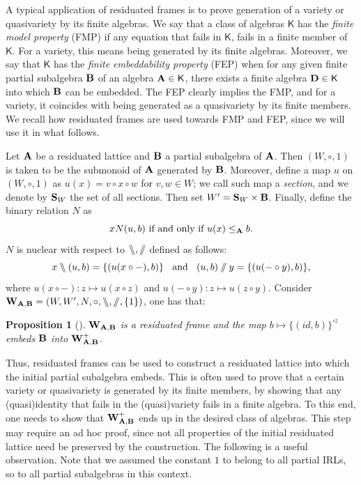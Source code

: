 \documentclass{amsart}
\newtheorem{proposition}[theorem]{Proposition}
\theoremstyle{definition}
\numberwithin{equation}{section}
\newcommand{\alg}[1]{{\textbf{\upshape #1}}}  %
\newcommand{\vv}[1]{\mathsf {#1}}
\newcommand{\leftr}{\bbslash}
\newcommand{\rightr}{\sslash}
\begin{document}
A typical application of residuated frames is to prove generation of a variety or quasivariety by its finite algebras. We say that a class of algebras $\vv K$ has the {\em finite model property} (FMP) if any equation that fails in $\vv K$, fails in a finite member of $\vv K$. For a variety, this means being generated by its finite algebras. Moreover, we say that $\vv K$ has the {\em finite embeddability property} (FEP) when for any given finite partial subalgebra $\alg B$ of an algebra $\alg A \in \vv K$, there exists a finite algebra $\alg D \in \vv K$ into which $\alg B$ can be embedded. The FEP clearly implies the FMP, and for a variety, it coincides with being generated as a quasivariety by its finite members. We recall how residuated frames are used towards FMP and FEP, since we will use it in what follows.
 
 Let $\alg A$ be a residuated lattice and $\alg B$ a partial subalgebra of $\alg A$. Then $(W, \circ, 1)$ is taken to be the submonoid of $\alg A$ generated by $\alg B$. Moreover, define a map $u$ on $(W, \circ, 1)$ as $u(x)=v \circ x \circ w$ for $v, w \in W$; we call such map a {\em section}, and we denote by $\alg S_W$ the set of all sections. Then set $W'=\alg S_W \times \alg B$. Finally, define the binary relation $N$ as $$x N (u,b) \mbox{ if and only if } u(x)\leq_{\alg A} b.$$ $N$ is nuclear with respect to $\leftr,\rightr$ defined as follows: 
 $$x \leftr (u,b)= \{(u(x \circ -), b)\} \;\;\mbox{ and }\;\; (u,b) \rightr y= \{(u(- \circ y), b)\},$$
 where $u(x \circ -): z \mapsto u(x \circ z)$ and $u(- \circ y): z \mapsto u(z \circ y)$.
Consider $\alg W_{\alg A, \alg B}=(W,W',N, \circ, \leftr, \rightr, \{1\})$, one has that: 
 \begin{proposition}[{\cite{GalatosJipsen2013}}]\label{prop:galatosjipsen}
$\alg W_{\alg A, \alg B}$ is a residuated frame and the map $b \mapsto \{(id, b)\}^\triangleleft$ embeds $\alg B$ into $\alg W_{\alg A, \alg B}^+$. 
\end{proposition}
Thus, residuated frames can be used to construct a residuated lattice into which the initial partial subalgebra embeds. This is often used to prove that a certain variety or quasivariety is generated by its finite members,  by showing that any (quasi)identity that fails in the (quasi)variety fails in a finite algebra. To this end, one needs to show that $\alg W_{\alg A, \alg B}^+$ ends up in the desired class of algebras. This step may require an ad hoc proof, since not all properties of the initial residuated lattice need be preserved by the construction. The following is a useful observation. Note that we assumed the constant $1$ to belong to all partial IRLs, so to all partial subalgebras in this context.
 
\end{document}
